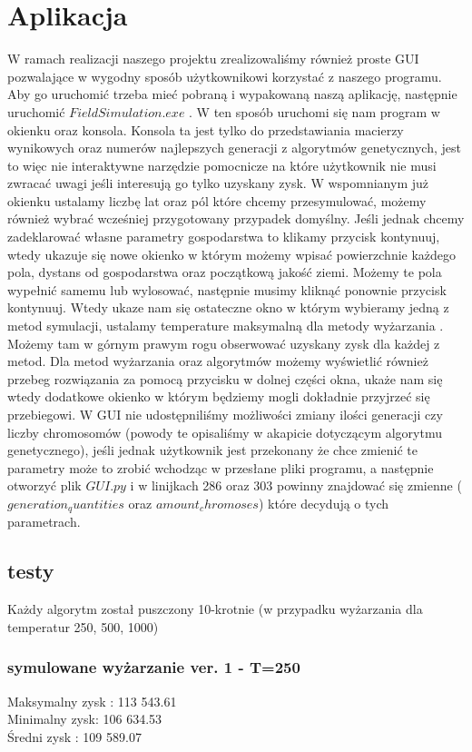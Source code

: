 \documentclass{article}
\begin{document}
\section{Aplikacja}
W ramach realizacji naszego projektu zrealizowaliśmy również proste GUI pozwalające w wygodny sposób użytkownikowi korzystać z naszego programu. Aby go uruchomić trzeba mieć pobraną i wypakowaną naszą aplikację, następnie uruchomić $FieldSimulation.exe$ . W ten sposób uruchomi się nam program w okienku oraz konsola. Konsola ta jest tylko do przedstawiania macierzy wynikowych oraz numerów najlepszych generacji z algorytmów genetycznych, jest to więc nie interaktywne narzędzie pomocnicze na które użytkownik nie musi zwracać uwagi jeśli interesują go tylko uzyskany zysk. W wspomnianym już okienku  ustalamy liczbę lat oraz pól które chcemy przesymulować, możemy również wybrać wcześniej przygotowany przypadek domyślny. Jeśli jednak chcemy zadeklarować własne parametry gospodarstwa to klikamy przycisk kontynuuj, wtedy ukazuje się nowe okienko w którym możemy wpisać powierzchnie każdego pola, dystans od gospodarstwa oraz początkową jakość ziemi. Możemy te pola wypełnić samemu lub wylosować, następnie musimy kliknąć ponownie przycisk kontynuuj. Wtedy ukaze nam się ostateczne okno w którym wybieramy jedną z metod symulacji, ustalamy temperature maksymalną dla metody wyżarzania . Możemy tam w górnym prawym rogu obserwować uzyskany zysk dla każdej z metod. Dla metod wyżarzania oraz algorytmów możemy wyświetlić również przebeg rozwiązania za pomocą przycisku w dolnej części okna, ukaże nam się wtedy dodatkowe okienko w którym będziemy mogli dokładnie przyjrzeć się przebiegowi. W  GUI nie udostępniliśmy możliwości zmiany ilości generacji czy liczby chromosomów (powody te opisaliśmy w akapicie dotyczącym algorytmu genetycznego), jeśli jednak użytkownik jest przekonany że chce zmienić te parametry może to zrobić wchodząc w przesłane pliki programu, a następnie otworzyć plik $GUI.py$ i w linijkach 286 oraz 303 powinny znajdować się zmienne ($generation_quantities$ oraz $amount_chromoses$) które decydują o tych parametrach.

\subsection{testy}
Każdy algorytm został puszczony 10-krotnie (w przypadku wyżarzania dla temperatur 250, 500, 1000)

\subsubsection{symulowane wyżarzanie ver. 1 - T=250}
Maksymalny zysk : 113 543.61\\
Minimalny zysk: 106 634.53\\
Średni zysk : 109 589.07\\
\end{document}
